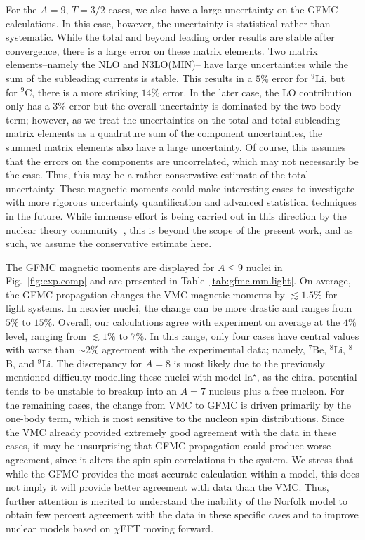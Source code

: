 \documentclass[aps,prc,floatfix,showpacs,twocolumn, preprintnumbers]{revtex4-2}
\begin{document}
For the $A=9, \,T=3/2$ cases, we also have a large uncertainty on the GFMC calculations. In this case, however, the uncertainty is statistical rather than systematic. While the total and beyond leading order results are stable after convergence, there is a large error on these matrix elements. Two matrix elements--namely the NLO and N3LO(MIN)-- have large uncertainties while the sum of the subleading currents is stable. This results in a $5\%$ error for $^9$Li, but for $^9$C, there is a more striking $14\%$ error. In the later case, the LO contribution only has a $3\%$ error but the overall uncertainty is dominated by the two-body term; however, as we treat the uncertainties on the total and total subleading matrix elements as a quadrature sum of the component uncertainties, the summed matrix elements also have a large uncertainty. Of course, this assumes that the errors on the components are uncorrelated, which may not necessarily be the case. Thus, this may be a rather conservative estimate of the total uncertainty. These magnetic moments could make interesting cases to investigate with more rigorous uncertainty quantification and advanced statistical techniques in the future. While immense effort is being carried out in this direction by the nuclear theory community~\cite{Phillips:2020dmw,Furnstahl:2015rha,Melendez:2019izc,Wesolowski:2021cni}, this is beyond the scope of the present work, and as such, we assume the conservative estimate here. 

The GFMC magnetic moments are displayed for $A\leq 9$ nuclei in Fig.~\ref{fig:exp.comp} and are presented in Table~\ref{tab:gfmc.mm.light}. On average, the GFMC propagation changes the VMC magnetic moments by $\lesssim 1.5\%$ for light systems. In heavier nuclei, the change can be more drastic and ranges from $5\%$ to $15\%$. Overall, our calculations agree with experiment on average at the $4\%$ level, ranging from $\lesssim 1\%$ to $7\%$. In this range, only four cases have central values with worse than ${\sim}2\%$ agreement with the experimental data; namely, $^7$Be, $^8$Li, $^8$B, and $^9$Li. The discrepancy for $A=8$ is most likely due to the previously mentioned difficulty modelling these nuclei with model Ia$^{\star}$, as the chiral potential tends to be unstable to breakup into an $A=7$ nucleus plus a free nucleon. For the remaining cases, the change from VMC to GFMC is driven primarily by the one-body term, which is most sensitive to the nucleon spin distributions. Since the VMC already provided extremely good agreement with the data in these cases, it may be unsurprising that GFMC propagation could produce worse agreement, since it alters the spin-spin correlations in the system. We stress that while the GFMC provides the most accurate calculation within a model, this does not imply it will provide better agreement with data than the VMC. Thus, further attention is merited to understand the inability of the Norfolk model to obtain few percent agreement with the data in these specific cases and to improve nuclear models based on $\chi$EFT moving forward. 
\end{document}
